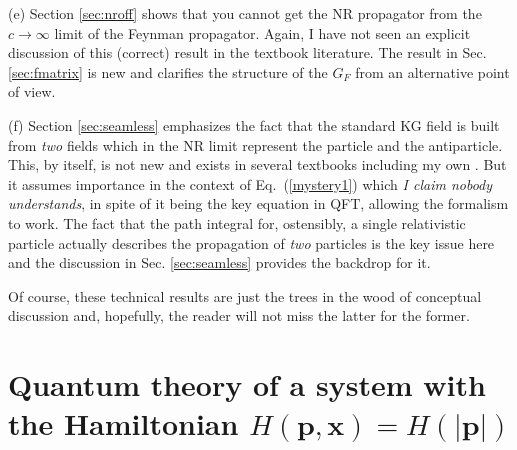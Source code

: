 \documentclass[12pt]{article}
\def\eq#1{{Eq.~(\ref{#1})}}
\begin{document}
(e) Section \ref{sec:nroff} shows that you cannot get the NR propagator from the $c\to\infty$ limit of the Feynman propagator. Again, I have not seen an explicit discussion of this (correct) result in the textbook literature. The result in Sec. \ref{sec:fmatrix} is new and clarifies the structure of the $G_F$ from an alternative point of view.

(f) Section \ref{sec:seamless} emphasizes the fact that the standard KG field is built from \textit{two} fields which in the NR limit represent the particle and the antiparticle. This, by itself, is not new and exists in several textbooks including my own \cite{tpqft}. But it assumes importance in the context of \eq{mystery1} which \textit{I claim nobody understands}, in spite of it being  the key equation in QFT, allowing the formalism to work. The fact that the path integral for, ostensibly, a single relativistic particle actually describes the propagation of \textit{two} particles is the key issue here and the discussion in Sec. \ref{sec:seamless} provides the backdrop for it.

Of course, these technical results are just the trees in the wood of conceptual discussion and, hopefully, the reader will not miss the latter for the former.


\section{Quantum theory of a  system with the Hamiltonian \texorpdfstring{$H(\bm{p},\bm{x})=H(|\bm{p}|)$}{$H({p},{x})=H(|{p}|)$}}\label{sec:hofp}
\end{document}
